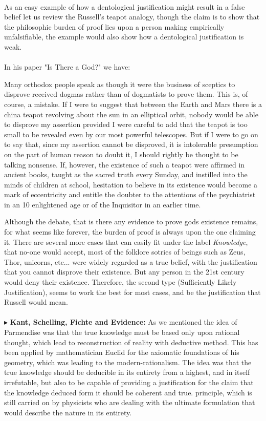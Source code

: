 \documentclass[9pt,a4paper,twocolumn]{article}
\newcommand{\newpoint}[1]{\indent$\blacktriangleright$ \textbf{#1}}
\begin{document}
                \\
                As an easy example of how a dentological justification might result in a false belief let us review the Russell's teapot analogy, though the claim is to show that the philosophic burden of proof lies upon a person making empirically unfalsifiable, the example would also show how a dentological justification is weak. \cite{enwiki:1149010951}
                \\
                \\
                In his paper "Is There a God?" we have:
                \begin{qt}
                    Many orthodox people speak as though it were the business of sceptics to disprove received dogmas rather than of dogmatists to prove them. This is, of course, a mistake. If I were to suggest that between the Earth and Mars there is a china teapot revolving about the sun in an elliptical orbit, nobody would be able to disprove my assertion provided I were careful to add that the teapot is too small to be revealed even by our most powerful telescopes. But if I were to go on to say that, since my assertion cannot be disproved, it is intolerable presumption on the part of human reason to doubt it, I should rightly be thought to be talking nonsense. If, however, the existence of such a teapot were affirmed in ancient books, taught as the sacred truth every Sunday, and instilled into the minds of children at school, hesitation to believe in its existence would become a mark of eccentricity and entitle the doubter to the attentions of the psychiatrist in an 10 enlightened age or of the Inquisitor in an earlier time.
                \end{qt}
                Although the debate, that is there any evidence to prove gods existence remains, for what seems like forever, the burden of proof is always upon the one claiming it. There are several more cases that can easily fit under the label \textit{Knowledge}, that no-one would accept, most of the folklore sotries of beings such as Zeus, Thor, unicorns, etc... were widely regarded as a true belief, with the justification that you cannot disprove their existence. But any person in the 21st century would deny their existence. Therefore, the second type (Sufficiently Likely Justification), seems to work the best for most cases, and be the justification that Russell would mean.\cite{Russell1952}
                \\
                \\
                \newpoint{Kant, Schelling, Fichte and Evidence: }  As we mentioned the idea of Parmendise was that the true knowledge must be based only upon rational thought, which lead to reconstruction of reality with deductive method. This has been applied by mathematician Euclid for the axiomatic foundations of his geometry, which was leading to the modern-rationalism. The idea was that the true knowledge should be deducible in its entirety from a highest,  and in itself irrefutable, but also to be capable of providing a justification for the claim that the knowledge deduced form it should be coherent and true. principle, which is still carried on by physicists who are dealing with the ultimate formulation that would describe the nature in its entirety. 
\end{document}
